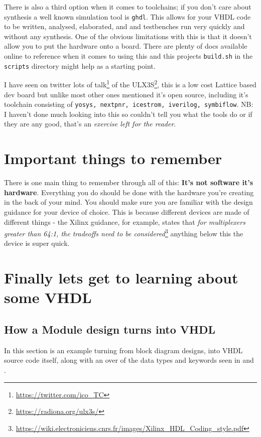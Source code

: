\documentclass[11pt,a4paper]{article}
\begin{document}
There is also a third option when it comes to toolchains; if you don't care about synthesis a well known simulation tool is \texttt{ghdl}. This allows for your VHDL code to be written, analysed, elaborated, and and testbenches run very quickly and without any synthesis. One of the obvious limitations with this is that it doesn't allow you to put the hardware onto a board. There are plenty of docs available online to reference when it comes to using this and this projects \texttt{build.sh} in the \texttt{scripts} directory might help as a starting point.  

I have seen on twitter lots of talk\footnote{\url{https://twitter.com/ico_TC}} of the ULX3S\footnote{\url{https://radiona.org/ulx3s/}}, this is a low cost Lattice based dev board but unlike most other ones mentioned it's open source, including it's toolchain consisting of \texttt{yosys, nextpnr, icestrom, iverilog, symbiflow}. NB: I haven't done much looking into this so couldn't tell you what the tools do or if they are any good, that's an \emph{exercise left for the reader}.

\section{Important things to remember}
There is one main thing to remember through all of this: \textbf{It's not software it's hardware}. Everything you do should be done with the hardware you're creating in the back of your mind. You should make sure you are familiar with the design guidance for your device of choice. This is because different devices are made of different things - the Xilinx guidance, for example, states that \emph{for multiplexers greater than 64:1, the tradeoffs need to be considered}\footnote{\url{https://wiki.electroniciens.cnrs.fr/images/Xilinx_HDL_Coding_style.pdf}} anything below this the device is super quick. 


\section{Finally lets get to learning about some VHDL}

\subsection{How a Module design turns into VHDL} 
In this section is an example turning from block diagram designs, into VHDL source code itself, along with an over of the data types and keywords seen in  and .
\end{document}
